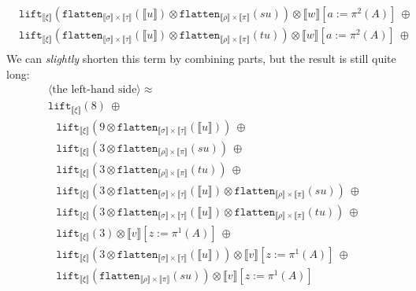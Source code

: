 \documentclass[a4paper,UKenglish,cleveref,autoref,numberwithinsect]{lipics-v2019}
\theoremstyle{definition}
\newcommand{\flatten}{\mathtt{flatten}}
\newcommand{\lift}{\mathtt{lift}}
\newcommand{\typeinterpret}[1]{\llbracket #1 \rrbracket}
\newcommand{\interpret}[1]{\llbracket #1 \rrbracket}
\begin{document}
\begin{itemize}
\[\begin{array}{l}
  \phantom{A}
    \lift_{\typeinterpret{\xi}}(\flatten_{\typeinterpret{\sigma} \times
    \typeinterpret{\tau}}(\interpret{u}) \otimes
    \flatten_{\typeinterpret{\rho} \times \typeinterpret{\pi}}(su))
    \otimes
    \interpret{w}[a:=\pi^2(A)]
    \ \oplus \\
  \phantom{A}
    \lift_{\typeinterpret{\xi}}(\flatten_{\typeinterpret{\sigma} \times
    \typeinterpret{\tau}}(\interpret{u}) \otimes
    \flatten_{\typeinterpret{\rho} \times \typeinterpret{\pi}}(tu))
    \otimes
    \interpret{w}[a:=\pi^2(A)]
    \ \oplus \\
  \end{array}
  \]
  We can \emph{slightly} shorten this term by combining parts, but
  the result is still quite long:
  \[
  \begin{array}{l}
  \langle\text{the left-hand side}\rangle \approx \\
  \lift_{\typeinterpret{\xi}}(8)\ \oplus \\
  \phantom{A}
     \lift_{\typeinterpret{\xi}}(9 \otimes
      \flatten_{\typeinterpret{\sigma} \times \typeinterpret{\tau}}(
      \interpret{u}))\ \oplus \\
  \phantom{A}
    \lift_{\typeinterpret{\xi}}(3 \otimes \flatten_{\typeinterpret{\rho}
    \times \typeinterpret{\pi}}(su))\ \oplus \\
  \phantom{A}
    \lift_{\typeinterpret{\xi}}(3 \otimes \flatten_{\typeinterpret{\rho}
    \times \typeinterpret{\pi}}(tu))\ \oplus \\
  \phantom{A}
    \lift_{\typeinterpret{\xi}}(3 \otimes \flatten_{\typeinterpret{\sigma}
    \times \typeinterpret{\tau}}(\interpret{u}) \otimes
    \flatten_{\typeinterpret{\rho} \times \typeinterpret{\pi}}(su))\ 
    \oplus \\
  \phantom{A}
    \lift_{\typeinterpret{\xi}}(3 \otimes \flatten_{\typeinterpret{\sigma}
    \times \typeinterpret{\tau}}(\interpret{u}) \otimes
    \flatten_{\typeinterpret{\rho} \times \typeinterpret{\pi}}(tu))\ 
    \oplus \\
  \phantom{A}
    \lift_{\typeinterpret{\xi}}(3) \otimes \interpret{v}[z:=\pi^1(A)]
    \ \oplus \\
  \phantom{A}
    \lift_{\typeinterpret{\xi}}(3 \otimes
    \flatten_{\typeinterpret{\sigma} \times \typeinterpret{\tau}}(
    \interpret{u})) \otimes
     \interpret{v}[z:=\pi^1(A)]
    \ \oplus \\
  \phantom{A}
    \lift_{\typeinterpret{\xi}}(\flatten_{\typeinterpret{\rho} \times
    \typeinterpret{\pi}}(su)) \otimes
     \interpret{v}[z:=\pi^1(A)]

\end{array}\]
\end{itemize}
\end{document}
